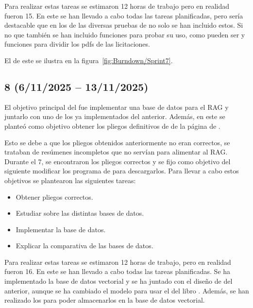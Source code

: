 Para realizar estas tareas se estimaron 12 horas de trabajo pero en realidad fueron 15. En este  se han llevado a cabo todas las tareas planificadas, pero sería destacable que en los  de las diversas pruebas de  no solo se han incluido estos. Si no que también se han incluido funciones para probar su uso, como pueden ser  y funciones para dividir los pdfs de las licitaciones.

El  de este  se ilustra en la figura~\ref{fig:Burndown/Sprint7}.

\subsection{ 8 (6/11/2025 -- 13/11/2025)}

El objetivo principal del  fue implementar una base de datos para el RAG y juntarlo con uno de los  ya implementados del  anterior. Además, en este  se planteó como objetivo obtener los pliegos definitivos de de la página de . 

Esto se debe a que los pliegos obtenidos anteriormente no eran correctos, se trataban de resúmenes incompletos que no servían para alimentar al RAG. Durante el  7, se encontraron los pliegos correctos y se fijo como objetivo del siguiente  modificar los programa de  para descargarlos. 
Para llevar a cabo estos objetivos se plantearon las siguientes tareas:
\begin{itemize}
\tightlist
	\item Obtener pliegos correctos.
	\item Estudiar sobre las distintas bases de datos.
	\item Implementar la base de datos.
	\item Explicar la comparativa de las bases de datos.
\end{itemize}

Para realizar estas tareas se estimaron 12 horas de trabajo, pero en realidad fueron 16. En este  se han llevado a cabo todas las tareas planificadas. Se ha implementado la base de datos vectorial  y se ha juntado con el diseño de  del  anterior, aunque se ha cambiado el modelo para usar el del libro . Además, se han realizado los  para poder almacenarlos en la base de datos vectorial.

